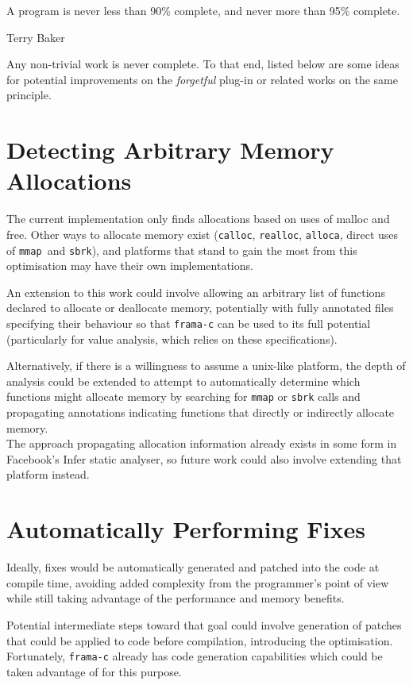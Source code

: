 \epigraph{A program is never less than 90\% complete, and never more than 95\% complete.}{Terry Baker}

Any non-trivial work is never complete. To that end, listed below are some ideas for potential improvements on the \emph{forgetful} plug-in or related works on the same principle.

\section{Detecting Arbitrary Memory Allocations}

The current implementation only finds allocations based on uses of malloc and free. Other ways to allocate memory exist (\texttt{calloc}, \texttt{realloc}, \texttt{alloca}, direct uses of \texttt{mmap }and \texttt{sbrk}), and platforms that stand to gain the most from this optimisation may have their own implementations.

An extension to this work could involve allowing an arbitrary list of functions declared to allocate or deallocate memory, potentially with fully annotated files specifying their behaviour so that \texttt{frama-c} can be used to its full potential (particularly for value analysis, which relies on these specifications).

Alternatively, if there is a willingness to assume a unix-like platform, the depth of analysis could be extended to attempt to automatically determine which functions might allocate memory by searching for \texttt{mmap} or \texttt{sbrk} calls and propagating annotations indicating functions that directly or indirectly allocate memory.\\
The approach propagating allocation information already exists in some form in Facebook's Infer \cite{fbinfer} static analyser, so future work could also involve extending that platform instead.

\section{Automatically Performing Fixes}

Ideally, fixes would be automatically generated and patched into the code at compile time, avoiding added complexity from the programmer's point of view while still taking advantage of the performance and memory benefits.

Potential intermediate steps toward that goal could involve generation of patches that could be applied to code before compilation, introducing the optimisation. Fortunately, \texttt{frama-c} already has code generation capabilities which could be taken advantage of for this purpose.

